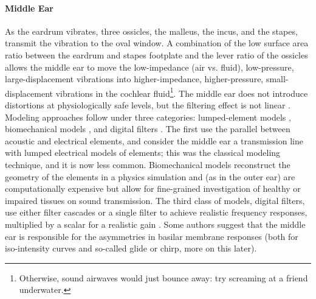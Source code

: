 \documentclass[11pt,a4paper]{article}
\begin{document}
\paragraph{Middle Ear}
As the eardrum vibrates, three ossicles, the malleus, the incus, and the stapes, transmit the vibration to the oval window. A combination of the low surface area ratio between the eardrum and stapes footplate and the lever ratio of the ossicles allows the middle ear to move the low-impedance (air vs. fluid), low-pressure, large-displacement vibrations into higher-impedance, higher-pressure, small-displacement vibrations in the cochlear fluid\footnote{Otherwise, sound airwaves would just bounce away: try screaming at a friend underwater.}. The middle ear does not introduce distortions at physiologically safe levels, but the filtering effect is not linear \cite{ruggeroMiddleearTransmissionHumans2003}. Modeling approaches follow under three categories: lumped-element models \cite{rosowskiModelsExternalMiddleEar1996}, biomechanical models \cite{ganThreedimensionalModelingMiddle2002}, and digital filters \cite{tanPhenomenologicalModelResponses2003}\cite{holmesTemporalRepresentationSpeech2004}. The first use the parallel between acoustic and electrical elements, and consider the middle ear a transmission line with lumped electrical models of elements; this was the classical modeling technique, and it is now less common. Biomechanical models reconstruct the geometry of the elements in a physics simulation and (as in the outer ear) are computationally expensive but allow for fine-grained investigation of healthy or impaired tissues on sound transmission. The third class of models, digital filters, use either filter cascades or a single filter to achieve realistic frequency responses, multiplied by a scalar for a realistic gain \cite{meddisAuditoryPeripheryPinna2010}. Some authors \cite{cheathamInnerHairCell2001}\cite{tanPhenomenologicalModelResponses2003} suggest that the middle ear is responsible for the asymmetries in basilar membrane responses (both for iso-intensity curves and so-called glide or chirp, more on this later).
\end{document}
